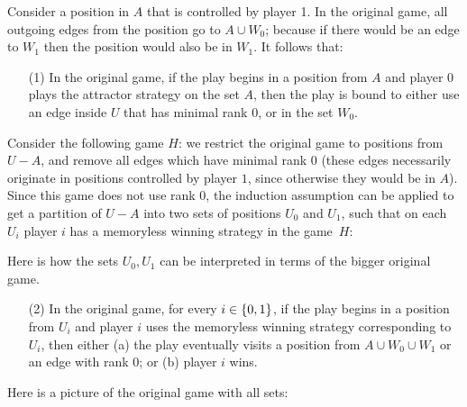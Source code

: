 Consider a position in $A$ that is controlled by player 1. In the original game, all outgoing edges from the position go to $A \cup W_0$; because if there would be an edge to $W_1$ then the position would also be in $W_1$. It follows that:
\begin{itemize}
	\item[(1)]  In the original game, if the play begins in a position from $A$ and player $0$ plays the attractor strategy on the set $A$, then the play is bound to either use an edge inside  $U$ that has minimal rank $0$, or in the set $W_0$.
\end{itemize}
Consider the following game $H$: we restrict the original game  to positions from $U-A$, and remove all edges which have minimal rank $0$ (these edges necessarily originate in positions controlled by player $1$, since otherwise they would be in $A$). Since this game does not use rank $0$, the induction assumption can be applied to get a partition of $U - A$ into two sets of positions $U_0$ and $U_1$, such that on each $U_i$ player $i$ has a memoryless winning strategy in the game~$H$:




Here is how the sets $U_0,U_1$ can be interpreted in terms of the bigger original game. 
\begin{itemize}
	\item[(2)] In the original game, for every $i \in \{0,1\}$, if the play begins in a position from $U_i$ and player $i$ uses the memoryless winning strategy corresponding to $U_i$, then  either (a) the play eventually visits a position from $A \cup W_0 \cup W_1$ or an edge with rank $0$; or (b) player $i$ wins.
\end{itemize}

Here is a picture of the original game with all sets:


